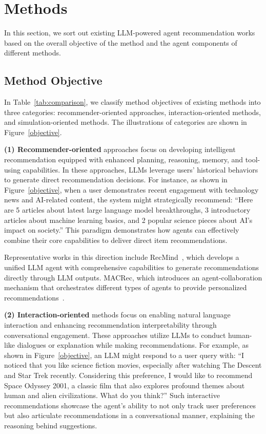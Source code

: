 \section{Methods}



In this section, we sort out existing LLM-powered agent recommendation works based on the overall objective of the method and the agent components of different methods.

\subsection{Method Objective}

In Table~\ref{tab:comparison}, we classify method objectives of existing methods into three categories: recommender-oriented approaches, interaction-oriented methods, and simulation-oriented methods.
The illustrations of categories are shown in Figure~\ref{objective}.


\textbf{(1) Recommender-oriented} approaches focus on developing intelligent recommendation equipped with enhanced planning, reasoning, memory, and tool-using capabilities. 
In these approaches, LLMs leverage users' historical behaviors to generate direct recommendation decisions. 
For instance, as shown in Figure~\ref{objective}, when a user demonstrates recent engagement with technology news and AI-related content, the system might strategically recommend: ``Here are 5 articles about latest large language model breakthroughs, 3 introductory articles about machine learning basics, and 2 popular science pieces about AI's impact on society.''
This paradigm demonstrates how agents can effectively combine their core capabilities to deliver direct item recommendations.


Representative works in this direction include RecMind~\cite{wang2024recmind}, which develops a unified LLM agent with comprehensive capabilities to generate recommendations directly through LLM outputs.
MACRec, which introduces an agent-collaboration mechanism that orchestrates different types of agents to provide personalized recommendations~\cite{wang2024macrec}.

\textbf{(2) Interaction-oriented} methods focus on enabling natural language interaction and enhancing recommendation interpretability through conversational engagement. 
These approaches utilize LLMs to conduct human-like dialogues or explanation while making recommendations. 
For example, as shown in Figure~\ref{objective}, an LLM might respond to a user query with: ``I noticed that you like science fiction movies, especially after watching The Descent and Star Trek recently. Considering this preference, I would like to recommend Space Odyssey 2001, a classic film that also explores profound themes about human and alien civilizations. What do you think?''
Such interactive recommendations showcase the agent's ability to not only track user preferences but also articulate recommendations in a conversational manner, explaining the reasoning behind suggestions.

